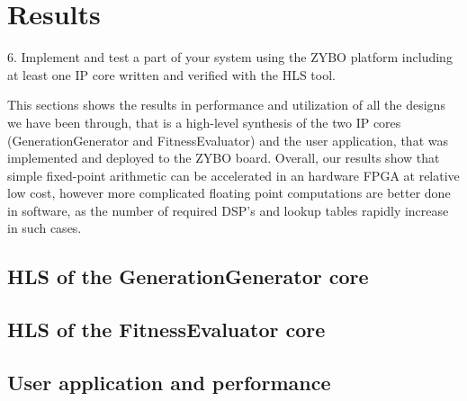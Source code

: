 \section{Results}\label{sec:results}
\begin{framed}
6. Implement and test a part of your system using the ZYBO platform including at least one IP core written and verified with the HLS tool.
\end{framed}

This sections shows the results in performance and utilization of all the designs we have been through, that is a high-level synthesis of the two IP cores (GenerationGenerator and FitnessEvaluator) and the user application, that was implemented and deployed to the ZYBO board. Overall, our results show that simple fixed-point arithmetic can be accelerated in an hardware FPGA at relative low cost, however more complicated floating point computations are better done in software, as the number of required DSP's and lookup tables rapidly increase in such cases.

\subsection{HLS of the GenerationGenerator core}
\subsection{HLS of the FitnessEvaluator core}
\subsection{User application and performance}




